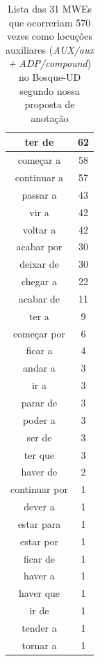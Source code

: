 \documentclass[output=paper,colorlinks,citecolor=brown]{langscibook}
\begin{document}
\begin{table}[]
{\begin{tabular}{|c|c|}
				ter de & 62\\\hline
				começar a & 58\\\hline
				continuar a & 57\\\hline
				passar a & 43\\\hline
				vir a & 42\\\hline
				voltar a & 42\\\hline
				acabar por & 30\\\hline
				deixar de & 30\\\hline
				chegar a & 22\\\hline
				acabar de & 11\\\hline
				ter a & 9\\\hline
				começar por & 6\\\hline
				ficar a & 4\\\hline
				andar a & 3\\\hline
				ir a & 3\\\hline
				parar de & 3\\\hline
				poder a & 3\\\hline
				ser de & 3\\\hline
				ter que & 3\\\hline
				haver de & 2\\\hline
				continuar por & 1\\\hline
				dever a & 1\\\hline
				estar para & 1\\\hline
				estar por & 1\\\hline
				ficar de & 1\\\hline
				haver a & 1\\\hline
				haver que & 1\\\hline
				ir de & 1\\\hline
				tender a & 1\\\hline
				tornar a & 1\\\hline
			\end{tabular}
		}
		\caption{Lista das 31 MWEs que ocorreriam 570 vezes como locuções auxiliares (\emph{AUX/aux + ADP/compound}) no Bosque-UD segundo nossa proposta de anotação}
		\label{tab:auxphrasalverb}
	\end{table}
\end{document}
